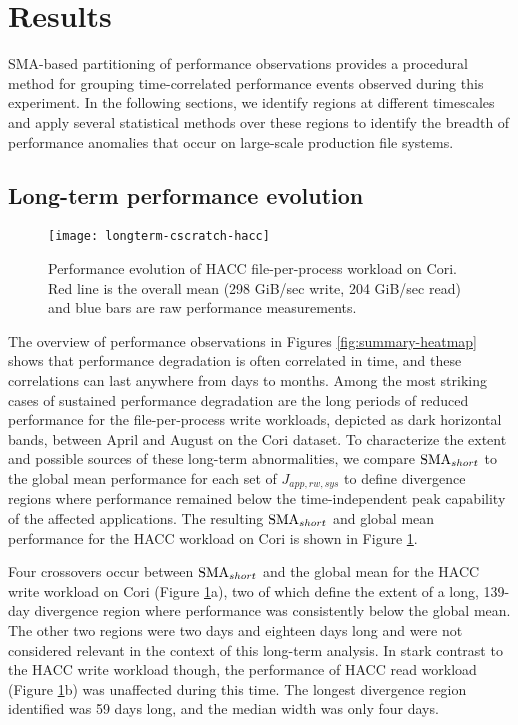 \section{Results}\label{sec:results}

SMA-based partitioning of performance observations provides a procedural method for grouping time-correlated performance events observed during this experiment.
In the following sections, we identify regions at different timescales and apply several statistical methods over these regions to identify the breadth of performance anomalies that occur on large-scale production file systems.

\subsection{Long-term performance evolution} \label{sec:results/longterm}

\begin{figure}[t]
    \centering
    \texttt{[image: longterm-cscratch-hacc]}
    \vspace{-.35in}
    \caption{Performance evolution of HACC file-per-process workload on Cori.  Red line is the overall mean (298 GiB/sec write, 204 GiB/sec read) and blue bars are raw performance measurements.}
    \label{fig:timeseries-baseline}
\end{figure}

The overview of performance observations in Figures \ref{fig:summary-heatmap} shows that performance degradation is often correlated in time, and these correlations can last anywhere from days to months.
Among the most striking cases of sustained performance degradation are the long periods of reduced performance for the file-per-process write workloads, depicted as dark horizontal bands, between April and August on the Cori dataset.
To characterize the extent and possible sources of these long-term abnormalities, we compare $\textup{SMA}_{short}$ to the global mean performance for each set of $J_{app, rw, sys}$ to define divergence regions where performance remained below the time-independent peak capability of the affected applications.
The resulting $\textup{SMA}_{short}$ and global mean performance for the HACC workload on Cori is shown in Figure \ref{fig:timeseries-baseline}.

Four crossovers occur between $\textup{SMA}_{short}$ and the global mean for the HACC write workload on Cori (Figure \ref{fig:timeseries-baseline}a), two of which define the extent of a long, 139-day divergence region where performance was consistently below the global mean.
The other two regions were two days and eighteen days long and were not considered relevant in the context of this long-term analysis.
In stark contrast to the HACC write workload though, the performance of HACC read workload (Figure \ref{fig:timeseries-baseline}b) was unaffected during this time.
The longest divergence region identified was 59 days long, and the median width was only four days.


